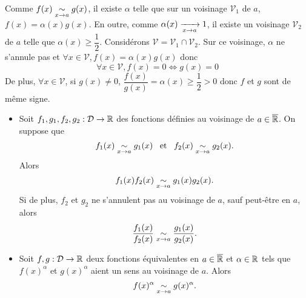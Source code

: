 \documentclass{magnolia}
\begin{document}
\begin{preuve}
Comme $\displaystyle f(x)\underset{x\rightarrow a}{\sim} g(x)$, il existe $\alpha$ telle que sur un voisinage $\mathcal{V}_1$ de $a$, $f(x)=\alpha(x)g(x)$. En outre, comme $\alpha(x)\xrightarrow[x\rightarrow a]{}1$, il existe un voisinage $\mathcal{V}_2$ de $a$ telle que $\alpha(x)\geq \dfrac{1}{2}$. Considérons $\mathcal{V}=\mathcal{V}_1\cap\mathcal{V}_2$. Sur ce voisinage, $\alpha$ ne s'annule pas et $\forall x \in \mathcal{V}, f(x)=\alpha(x)g(x)$ donc \[\forall x\in \mathcal{V}, f(x)=0\Longleftrightarrow g(x)=0\]
De plus, $\forall x\in \mathcal{V}$, si $g(x)\neq0$, $\dfrac{f(x)}{g(x)}=\alpha(x)\geq \dfrac{1}{2}>0$ donc $f$ et $g$ sont de même signe.

\end{preuve}

\begin{proposition}[utile=-3]
\begin{itemize}
\item Soit $f_1,g_1,f_2,g_2:\mathcal{D}\to\mathbb{R}$ des fonctions définies au voisinage de $a\in\overline{\mathbb{R}}$.
  On suppose que
  \[f_1(x)\underset{x\rightarrow a}{\sim} g_1(x) \quad\!\text{et}\quad\! f_2(x)\underset{x\rightarrow a}{\sim} g_2(x).\]
  Alors
  \[f_1(x)f_2(x) \underset{x\rightarrow a}{\sim} g_1(x)g_2(x).\]
  Si de plus, $f_2$ et $g_2$ ne s'annulent pas au voisinage de $a$, sauf peut-être en $a$, alors
  \[\frac{f_1(x)}{f_2(x)} \underset{x\rightarrow a}{\sim} \frac{g_1(x)}{g_2(x)}.\]
\item Soit $f,g:\mathcal{D}\to\mathbb{R}$ deux fonctions équivalentes en $a\in\overline{\mathbb{R}}$ et
  $\alpha\in\mathbb{R}$ tels que $f(x)^\alpha$ et $g(x)^\alpha$ aient un sens au
  voisinage de $a$. Alors
  \[f(x)^\alpha \underset{x\rightarrow a}{\sim} g(x)^{\alpha}.\]
\end{itemize}
\end{proposition}
\end{document}
